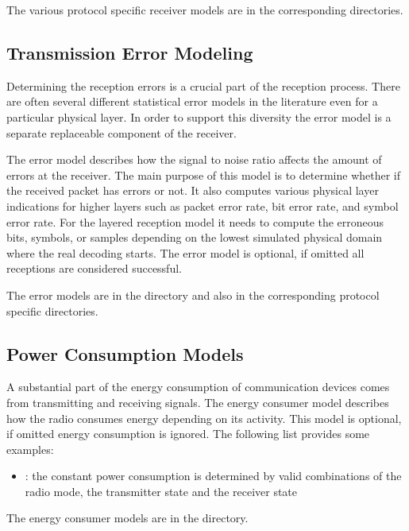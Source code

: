 The various protocol specific receiver models are in the corresponding 
directories.

\subsection{Transmission Error Modeling}

Determining the reception errors is a crucial part of the reception process.
There are often several different statistical error models in the literature
even for a particular physical layer. In order to support this diversity the
error model is a separate replaceable component of the receiver. 

The error model describes how the signal to noise ratio affects the amount of
errors at the receiver. The main purpose of this model is to determine whether
if the received packet has errors or not. It also computes various physical
layer indications for higher layers such as packet error rate, bit error rate,
and symbol error rate. For the layered reception model it needs to compute the
erroneous bits, symbols, or samples depending on the lowest simulated physical
domain where the real decoding starts. The error model is optional, if omitted
all receptions are considered successful.

The error models are in the  directory and
also in the corresponding protocol specific directories.

\subsection{Power Consumption Models}

A substantial part of the energy consumption of communication devices comes from
transmitting and receiving signals. The energy consumer model describes how the
radio consumes energy depending on its activity. This model is optional, if
omitted energy consumption is ignored. The following list provides some examples:

\begin{itemize}
  \item {}: the constant power consumption is
determined by valid combinations of the radio mode, the transmitter state and
the receiver state
\end{itemize}

The energy consumer models are in the  directory.

